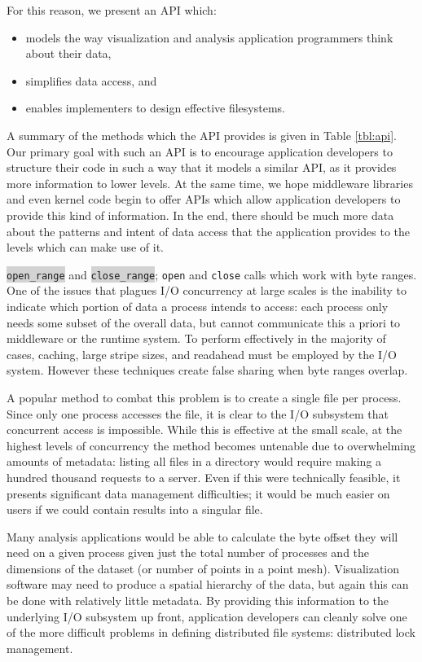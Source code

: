 For this reason, we present an API which:

\begin{itemize}
  \item models the way visualization and analysis application
  programmers think about their data,
  \item simplifies data access, and
  \item enables implementers to design effective filesystems.
\end{itemize}

A summary of the methods which the API provides is given in Table
\ref{tbl:api}.  Our primary goal with such an API is to encourage
application developers to structure their code in such a way that it
models a similar API, as it provides more information to lower levels.
At the same time, we hope middleware libraries and even kernel code
begin to offer APIs which allow application developers to provide this
kind of information.  In the end, there should be much more data about
the patterns and intent of data access that the application provides to
the levels which can make use of it.

\colorbox{lightgray}{\texttt{open\_range}} and
\colorbox{lightgray}{\texttt{close\_range}}; \verb!open! and \verb!close!
calls which work with byte ranges.
One of the issues that plagues I/O concurrency
at large scales is the inability to indicate which portion of data
a process intends to
access: each process only needs some subset of the overall data, but
cannot communicate this a priori to middleware or the runtime system.
To perform effectively in the majority of cases, caching, large stripe
sizes, and readahead must be employed by the I/O system.  However these
techniques create false sharing when byte ranges overlap.

A popular method to combat this problem is to create a single file per
process.  Since only one process accesses the file, it is clear to
the I/O subsystem that concurrent access is impossible.  While this
is effective at the small scale, at the highest levels of concurrency
the method becomes untenable due to overwhelming amounts of metadata:
listing all files in a directory would require making a hundred
thousand requests to a server.  Even if this were technically feasible,
it presents significant data management difficulties; it would be much
easier on users if we could contain results into a singular file.

Many analysis applications would be able to calculate the byte offset
they will need on a given process given just the total number of
processes and the dimensions of the dataset (or number of points in
a point mesh).  Visualization software may need to produce a spatial
hierarchy of the data, but again this can be done with relatively
little metadata.  By providing this information to the underlying
I/O subsystem up front, application developers can cleanly solve one
of the more difficult problems in defining distributed file systems:
distributed lock management.

